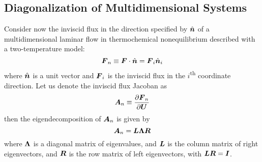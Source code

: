 \subsection{Diagonalization of Multidimensional Systems}
Consider now the inviscid flux in the direction specified by $\hat{{\boldsymbol{n}}}$ of a multidimensional laminar flow in thermochemical nonequilibrium described with a two-temperature model:
\begin{equation}
  {\boldsymbol{F}}_n \equiv {\boldsymbol{F}}\cdot\hat{{\boldsymbol{n}}} = {\boldsymbol{F}}_i\hat{{\boldsymbol{n}}}_i
\end{equation}
where $\hat{{\boldsymbol{n}}}$ is a unit vector and ${\boldsymbol{F}}_i$ is the inviscid flux in the $i$\textsuperscript{th} coordinate direction. Let us denote the inviscid flux Jacoban as
\begin{equation}
  {\boldsymbol{A}}_n \equiv {\frac{\partial{{\boldsymbol{F}}_n}}{\partial{{\boldsymbol{U}}}}}
\end{equation}
then the eigendecomposition of ${\boldsymbol{A}}_n$ is given by
\begin{equation}
  {\boldsymbol{A}}_n = {\boldsymbol{L}}{\boldsymbol{\Lambda}}{\boldsymbol{R}}
\end{equation}
where ${\boldsymbol{\Lambda}}$ is a diagonal matrix of eigenvalues, and  ${\boldsymbol{L}}$ is the column matrix of right eigenvectors, and ${\boldsymbol{R}}$ is the row matrix of left eigenvectors, with ${\boldsymbol{L}}{\boldsymbol{R}}={\boldsymbol{I}}$.  


